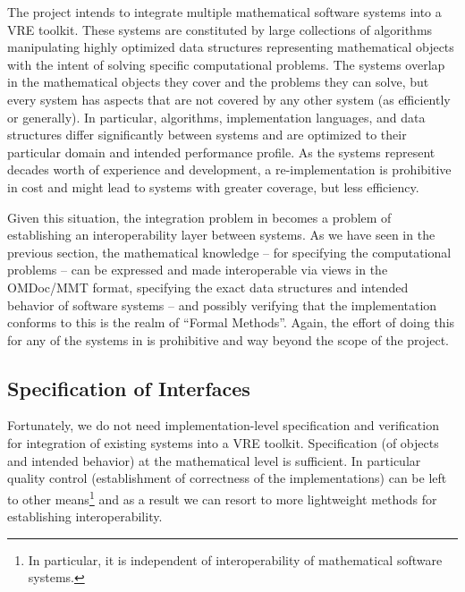 The \pn project intends to integrate multiple mathematical software systems into a VRE
toolkit. These systems are constituted by large collections of algorithms manipulating
highly optimized data structures representing mathematical objects with the intent of
solving specific computational problems. The systems overlap in the mathematical
objects they cover and the problems they can solve, but every system has aspects that are
not covered by any other system (as efficiently or generally). In particular, algorithms,
implementation languages, and data structures differ significantly between systems and are
optimized to their particular domain and intended performance profile. As the systems
represent decades worth of experience and development, a re-implementation is prohibitive
in cost and might lead to systems with greater coverage, but less efficiency.

Given this situation, the integration problem in \pn becomes a problem of establishing an
interoperability layer between systems. As we have seen in the previous section, the
mathematical knowledge -- for specifying the computational problems -- can be expressed
and made interoperable via views in the OMDoc/MMT format, specifying the exact data
structures and intended behavior of software systems -- and possibly verifying that the
implementation conforms to this is the realm of ``Formal Methods''. Again, the effort of
doing this for any of the systems in \pn is prohibitive and way beyond the scope of the
project.

\subsection{Specification of Interfaces}

Fortunately, we do not need implementation-level specification and verification for
integration of existing systems into a VRE toolkit. Specification (of objects and intended
behavior) at the mathematical level is sufficient. In particular quality control
(establishment of correctness of the implementations) can be left to other
means\footnote{In particular, it is independent of interoperability of mathematical
  software systems.} and as a result we can resort to more lightweight methods for
establishing interoperability.

